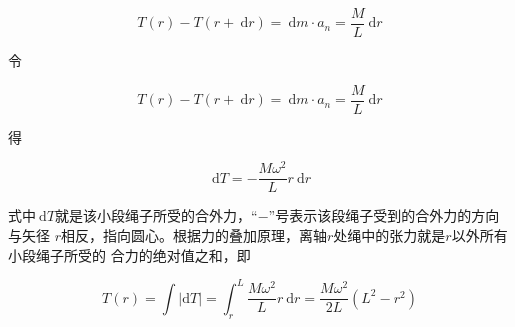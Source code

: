 \documentclass[12pt, a4paper]{article}
\numberwithin{equation}{section}
\newcommand{\rmd}{\mathrm{~d}}
\begin{document}
    $$
        T(r)-T(r+\rmd r)=\rmd m \cdot a_n=\frac{M}{L} \rmd r
    $$

    令

    $$
        T(r)-T(r+\rmd r)=\rmd m \cdot a_n=\frac{M}{L} \rmd r
    $$

    得

    $$
        \rmd T=-\frac{M \omega^2}{L} r \rmd r
    $$

    式中\(\rmd T\)就是该小段绳子所受的合外力，“\(-\)”号表示该段绳子受到的合外力的方向与矢径
    \(r\)相反，指向圆心。根据力的叠加原理，离轴\(r\)处绳中的张力就是\(r\)以外所有小段绳子所受的
    合力的绝对值之和，即

    $$
        T(r)=\int|\mathrm{d} T|=\int_r^L \frac{M \omega^2}{L} r \mathrm{~d} r=\frac{M \omega^2}{2 L}\left(L^2-r^2\right)
    $$
\end{document}
